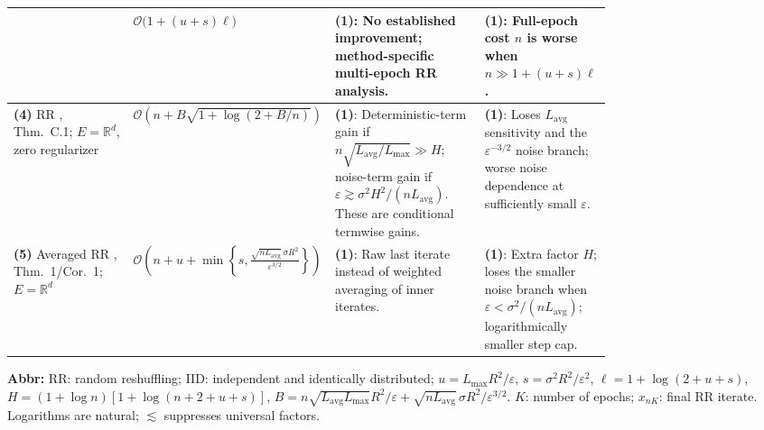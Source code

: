\begin{table}[tp]
\begin{threeparttable}
\begin{tabularx}{\linewidth}{@{}>{\raggedright\arraybackslash}p{0.20\linewidth}>{\raggedright\arraybackslash}p{0.32\linewidth}>{\raggedright\arraybackslash}p{0.25\linewidth}>{\raggedright\arraybackslash}X@{}}
& $\mathcal{O}\bigl(1+(u+s)\ell\bigr)$
& \textbf{(1)}: No established improvement; method-specific multi-epoch RR analysis.
& \textbf{(1)}: Full-epoch cost $n$ is worse when $n\gg1+(u+s)\ell$. \\
\midrule
\textbf{(4)} RR \citep{csrrLiuZhou2024v3}, Thm.~C.1; $E=\mathbb{R}^d$, zero regularizer
& $\mathcal{O}\!\left(n+B\sqrt{1+\log(2+B/n)}\right)$
& \textbf{(1)}: Deterministic-term gain if $n\sqrt{L_{\mathrm{avg}}/L_{\max}}\gg H$; noise-term gain if $\varepsilon\gtrsim\sigma^2H^2/(nL_{\mathrm{avg}})$. These are conditional termwise gains.
& \textbf{(1)}: Loses $L_{\mathrm{avg}}$ sensitivity and the $\varepsilon^{-3/2}$ noise branch; worse noise dependence at sufficiently small $\varepsilon$. \\
\midrule
\textbf{(5)} Averaged RR \citep{csrrLiu2026v1}, Thm.~1/Cor.~1; $E=\mathbb{R}^d$
& $\mathcal{O}\!\left(n+u+\min\!\left\{s,\frac{\sqrt{nL_{\mathrm{avg}}}\,\sigma R^2}{\varepsilon^{3/2}}\right\}\right)$
& \textbf{(1)}: Raw last iterate instead of weighted averaging of inner iterates.
& \textbf{(1)}: Extra factor $H$; loses the smaller noise branch when $\varepsilon<\sigma^2/(nL_{\mathrm{avg}})$; logarithmically smaller step cap. \\
\bottomrule
\end{tabularx}
\begin{tablenotes}[flushleft]\footnotesize
\item[] \textbf{Abbr:} RR: random reshuffling; IID: independent and identically distributed; $u=L_{\max}R^2/\varepsilon$, $s=\sigma^2R^2/\varepsilon^2$, $\ell=1+\log(2+u+s)$, $H=(1+\log n)[1+\log(n+2+u+s)]$, $B=n\sqrt{L_{\mathrm{avg}}L_{\max}}R^2/\varepsilon+\sqrt{nL_{\mathrm{avg}}}\,\sigma R^2/\varepsilon^{3/2}$. $K$: number of epochs; $x_{nK}$: final RR iterate. Logarithms are natural; $\lesssim$ suppresses universal factors.
\end{tablenotes}
\end{threeparttable}
\end{table}
\clearpage
